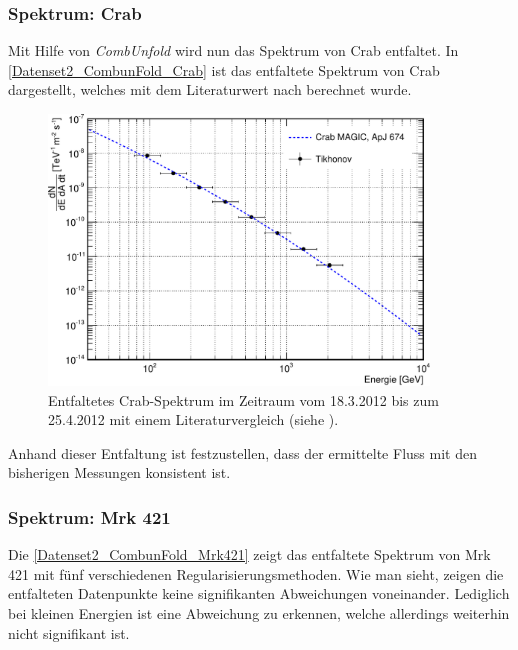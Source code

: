 \subsubsection{Spektrum: Crab}
Mit Hilfe von \textit{CombUnfold} wird nun das Spektrum von Crab entfaltet.
In \autoref{Datenset2_CombunFold_Crab} ist das entfaltete Spektrum von Crab dargestellt, welches mit dem Literaturwert nach \cite{LiteraturreferenzMAGIC} berechnet wurde.

\begin{figure}
    \centering
    \includegraphics[width=0.9\textwidth]{./Plots/04_MrkAnalyse/Datenset2/Crab_mit_Literatur.pdf}
    \caption{Entfaltetes Crab-Spektrum im Zeitraum vom 18.3.2012 bis zum 25.4.2012 mit einem Literaturvergleich (siehe \cite{LiteraturreferenzMAGIC}).}
    \label{Datenset2_CombunFold_Crab}
\end{figure}

Anhand dieser Entfaltung ist festzustellen, dass der ermittelte Fluss mit den bisherigen Messungen konsistent ist.

\subsubsection{Spektrum: Mrk 421}
Die \autoref{Datenset2_CombunFold_Mrk421} zeigt das entfaltete Spektrum von Mrk 421 mit fünf verschiedenen Regularisierungsmethoden.
Wie man sieht, zeigen die entfalteten Datenpunkte keine signifikanten Abweichungen voneinander. 
Lediglich bei kleinen Energien ist eine Abweichung zu erkennen, welche allerdings weiterhin nicht signifikant ist.

